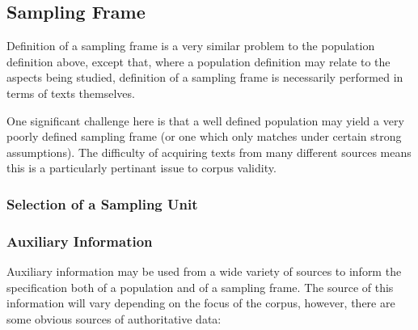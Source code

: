 



% 








\subsection{Sampling Frame}
Definition of a sampling frame is a very similar problem to the population definition above, except that, where a population definition may relate to the aspects being studied, definition of a sampling frame is necessarily performed in terms of texts themselves.

One significant challenge here is that a well defined population may yield a very poorly defined sampling frame (or one which only matches under certain strong assumptions).  The difficulty of acquiring texts from many different sources means this is a particularly pertinant issue to corpus validity.





\subsubsection{Selection of a Sampling Unit}


\subsubsection{Auxiliary Information}
Auxiliary information may be used from a wide variety of sources to inform the specification both of a population and of a sampling frame.  The source of this information will vary depending on the focus of the corpus, however, there are some obvious sources of authoritative data:

